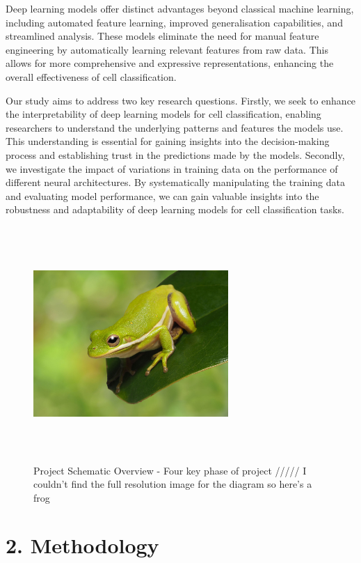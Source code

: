 \documentclass[letterpaper,9pt,twocolumn,twoside,]{pinp}
\begin{document}
Deep learning models offer distinct advantages beyond classical machine
learning, including automated feature learning, improved generalisation
capabilities, and streamlined analysis. These models eliminate the need
for manual feature engineering by automatically learning relevant
features from raw data. This allows for more comprehensive and
expressive representations, enhancing the overall effectiveness of cell
classification.

Our study aims to address two key research questions. Firstly, we seek
to enhance the interpretability of deep learning models for cell
classification, enabling researchers to understand the underlying
patterns and features the models use. This understanding is essential
for gaining insights into the decision-making process and establishing
trust in the predictions made by the models. Secondly, we investigate
the impact of variations in training data on the performance of
different neural architectures. By systematically manipulating the
training data and evaluating model performance, we can gain valuable
insights into the robustness and adaptability of deep learning models
for cell classification tasks.

\begin{figure}
  \begin{center}
    \includegraphics[width=0.66\textwidth, height=3.5in]{images/frog.png} 
  \end{center}
  \caption{Project Schematic Overview - Four key phase of project ///// I couldn't find the full resolution image for the diagram so here's a frog}\label{fig:Figure_1}
\end{figure}

\hypertarget{methodology}{%
\section{2. Methodology}\label{methodology}}
\end{document}
